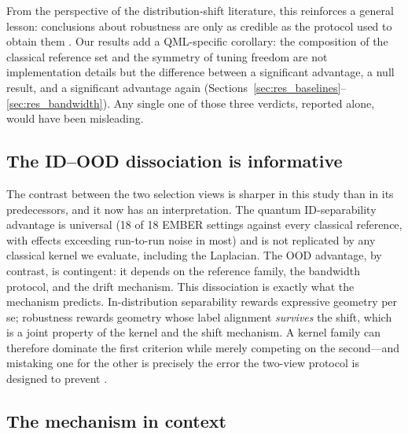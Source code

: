 \documentclass[journal]{IEEEtran}
\begin{document}
From the perspective of the distribution-shift literature, this reinforces a general lesson: conclusions about robustness are only as credible as the protocol used to obtain them \cite{quinonero-candela2008datasetshift,gulrajani2021domainbed,koh2021wilds,yao2022wildtime}. Our results add a QML-specific corollary: the composition of the classical reference set and the symmetry of tuning freedom are not implementation details but the difference between a significant advantage, a null result, and a significant advantage again (Sections~\ref{sec:res_baselines}--\ref{sec:res_bandwidth}). Any single one of those three verdicts, reported alone, would have been misleading.

\subsection{The ID--OOD dissociation is informative}

The contrast between the two selection views is sharper in this study than in its predecessors, and it now has an interpretation. The quantum ID-separability advantage is universal (18 of 18 EMBER settings against every classical reference, with effects exceeding run-to-run noise in most) and is not replicated by any classical kernel we evaluate, including the Laplacian. The OOD advantage, by contrast, is contingent: it depends on the reference family, the bandwidth protocol, and the drift mechanism. This dissociation is exactly what the mechanism predicts. In-distribution separability rewards expressive geometry per se; robustness rewards geometry whose label alignment \emph{survives} the shift, which is a joint property of the kernel and the shift mechanism. A kernel family can therefore dominate the first criterion while merely competing on the second---and mistaking one for the other is precisely the error the two-view protocol is designed to prevent \cite{gulrajani2021domainbed}.

\subsection{The mechanism in context}
\end{document}
